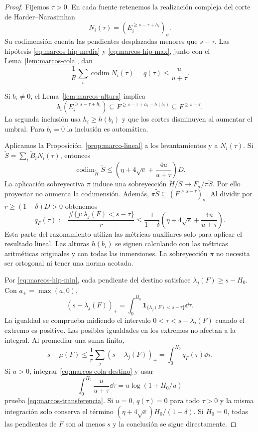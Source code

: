 \begin{proof}
Fijemos $\tau>0$. En cada fuente retenemos la realización compleja
del corte de Harder--Narasimhan
\[
 N_i(\tau)=(E_i^{\ge s-\tau+h_i})_\sigma.
\]
Su codimensión cuenta las pendientes desplazadas menores que
$s-\tau$. Las hipótesis \eqref{eq:marcos-hip-media} y
\eqref{eq:marcos-hip-max}, junto con el Lema~\ref{lem:marcos-cola},
dan
\begin{equation}
 \frac1R\sum_i\operatorname{codim}N_i(\tau)
 =q(\tau)\le\frac{u}{u+\tau}.
 \label{eq:marcos-descarte-fuentes}
\end{equation}

Si $b_i\ne0$, el Lema~\ref{lem:marcos-altura} implica
\[
 b_i(E_i^{\ge s-\tau+h_i})
 \subseteq F^{\ge s-\tau+h_i-h(b_i)}
 \subseteq F^{\ge s-\tau}.
\]
La segunda inclusión usa $h_i\ge h(b_i)$ y que los cortes disminuyen
al aumentar el umbral. Para $b_i=0$ la inclusión es automática.

Aplicamos la Proposición~\ref{prop:marco-lineal} a los levantamientos
y a $N_i(\tau)$. Si $\widetilde S=\sum_i\widetilde B_iN_i(\tau)$,
entonces
\[
 \operatorname{codim}_{\widetilde H}\widetilde S
 \le\left(\eta+4\sqrt e+\frac{4u}{u+\tau}\right)D.
\]
La aplicación sobreyectiva $\pi$ induce una sobreyección
$\widetilde H/\widetilde S\to F_\sigma/\pi\widetilde S$.
Por ello proyectar no aumenta la codimensión. Además,
$\pi\widetilde S\subseteq(F^{\ge s-\tau})_\sigma$.
Al dividir por $r\ge(1-\delta)D>0$ obtenemos
\begin{equation}
 q_F(\tau):=\frac{\#\{j:\lambda_j(F)<s-\tau\}}r
 \le\frac1{1-\delta}
       \left(\eta+4\sqrt e+\frac{4u}{u+\tau}\right).
 \label{eq:marcos-cola-destino}
\end{equation}
Esta parte del razonamiento utiliza las métricas auxiliares solo para
aplicar el resultado lineal. Las alturas $h(b_i)$ se siguen calculando
con las métricas aritméticas originales y con todas las inmersiones.
La sobreyección $\pi$ no necesita ser ortogonal ni tener una norma acotada.

Por \eqref{eq:marcos-hip-min}, cada pendiente del destino satisface
$\lambda_j(F)\ge s-H_0$. Con $a_+=\max(a,0)$,
\begin{equation}
 (s-\lambda_j(F))_+
 =\int_0^{H_0}\mathbf1_{\{\lambda_j(F)<s-\tau\}}\dd\tau.
 \label{eq:marcos-capas}
\end{equation}
La igualdad se comprueba midiendo el intervalo
$0<\tau<s-\lambda_j(F)$ cuando el extremo es positivo.
Las posibles igualdades en los extremos no afectan a la integral.
Al promediar una suma finita,
\begin{equation}
 s-\mu(F)\le\frac1r\sum_j(s-\lambda_j(F))_+
 =\int_0^{H_0}q_F(\tau)\dd\tau.
 \label{eq:marcos-deficit-medio}
\end{equation}
Si $u>0$, integrar \eqref{eq:marcos-cola-destino} y usar
\[
 \int_0^{H_0}\frac{u}{u+\tau}\dd\tau
 =u\log(1+H_0/u)
\]
prueba \eqref{eq:marcos-transferencia}.
Si $u=0$, $q(\tau)=0$ para todo $\tau>0$ y la misma integración
solo conserva el término $(\eta+4\sqrt e)H_0/(1-\delta)$.
Si $H_0=0$, todas las pendientes de $F$ son al menos $s$ y la
conclusión se sigue directamente.
\end{proof}

